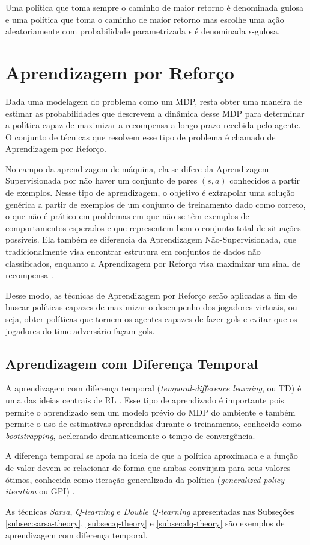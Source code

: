 Uma política que toma sempre o caminho de maior retorno é denominada gulosa e uma política que toma o caminho de maior retorno mas escolhe uma ação aleatoriamente com probabilidade parametrizada $\epsilon$ é denominada $\epsilon$-gulosa.


\section{Aprendizagem por Reforço}

Dada uma modelagem do problema como um MDP, resta obter uma maneira de estimar as probabilidades que descrevem a dinâmica desse MDP para determinar a política capaz de maximizar a recompensa a longo prazo recebida pelo agente. O conjunto de técnicas que resolvem esse tipo de problema é chamado de Aprendizagem por Reforço.

No campo da aprendizagem de máquina, ela se difere da Aprendizagem Supervisionada por não haver um conjunto de pares $(s, a)$ conhecidos a partir de exemplos.
Nesse tipo de aprendizagem, o objetivo é extrapolar uma solução genérica a partir de exemplos de um conjunto de treinamento dado como correto, o que não é prático em problemas em que não se têm exemplos de comportamentos esperados e que representem bem o conjunto total de situações possíveis.
Ela também se diferencia da Aprendizagem Não-Supervisionada, que tradicionalmente visa encontrar estrutura em conjuntos de dados não classificados, enquanto a Aprendizagem por Reforço visa maximizar um sinal de recompensa \cite{sutton2018reinforcement}.

Desse modo, as técnicas de Aprendizagem por Reforço serão aplicadas a fim de buscar políticas capazes de maximizar o desempenho dos jogadores virtuais, ou seja, obter políticas que tornem os agentes capazes de fazer gols e evitar que os jogadores do time adversário façam gols.

\subsection{Aprendizagem com Diferença Temporal}
\par A aprendizagem com diferença temporal (\textit{temporal-difference learning}, ou TD) é uma das ideias centrais de RL \cite{sutton2018reinforcement}. Esse tipo de aprendizado é importante pois permite o aprendizado sem um modelo prévio do MDP do ambiente e também permite o uso de estimativas aprendidas durante o treinamento, conhecido como \textit{bootstrapping}, acelerando dramaticamente o tempo de convergência. 
\par A diferença temporal se apoia na ideia de que a política aproximada e a função de valor devem se relacionar de forma que ambas convirjam para seus valores ótimos, conhecida como iteração generalizada da política (\textit{generalized policy iteration} ou GPI) \cite{sutton2018reinforcement}. 
\par As técnicas \textit{Sarsa}, \textit{Q-learning} e \textit{Double Q-learning} apresentadas nas Subseções \ref{subsec:sarsa-theory}, \ref{subsec:q-theory} e \ref{subsec:dq-theory} são exemplos de aprendizagem com diferença temporal.

